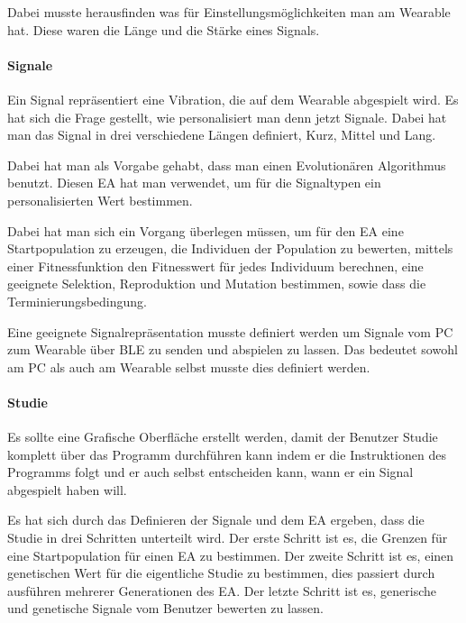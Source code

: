 Dabei musste herausfinden was f{\"u}r Einstellungsm{\"o}glichkeiten man am Wearable hat. Diese waren die L{\"a}nge und die St{\"a}rke eines Signals.

\paragraph{Signale}

Ein Signal repr{\"a}sentiert eine Vibration, die auf dem Wearable abgespielt wird. Es hat sich die Frage gestellt, wie personalisiert man denn jetzt Signale. Dabei hat man das Signal in drei verschiedene L{\"a}ngen definiert, Kurz, Mittel und Lang. 

Dabei hat man als Vorgabe gehabt, dass man einen Evolution{\"a}ren Algorithmus benutzt.
Diesen EA hat man verwendet, um f{\"u}r die Signaltypen ein personalisierten Wert bestimmen.

Dabei hat man sich ein Vorgang {\"u}berlegen m{\"u}ssen, um f{\"u}r den EA eine Startpopulation zu erzeugen, die Individuen der Population zu bewerten, mittels einer Fitnessfunktion den Fitnesswert f{\"u}r jedes Individuum berechnen, eine geeignete Selektion, Reproduktion und Mutation bestimmen, sowie dass die Terminierungsbedingung. 

Eine geeignete Signalrepr{\"a}sentation musste definiert werden um Signale vom PC zum Wearable {\"u}ber BLE zu senden und abspielen zu lassen. Das bedeutet sowohl am PC als auch am Wearable selbst musste dies definiert werden.

\paragraph{Studie}

Es sollte eine Grafische Oberfl{\"a}che erstellt werden, damit der Benutzer Studie komplett {\"u}ber das Programm durchf{\"u}hren kann indem er die Instruktionen des Programms folgt und er auch selbst entscheiden kann, wann er ein Signal abgespielt haben will.

Es hat sich durch das Definieren der Signale und dem EA ergeben, dass die Studie in drei Schritten unterteilt wird. 
Der erste Schritt ist es, die Grenzen f{\"u}r eine Startpopulation f{\"u}r einen EA zu bestimmen. 
Der zweite Schritt ist es, einen genetischen Wert f{\"u}r die eigentliche Studie zu bestimmen, dies passiert durch ausf{\"u}hren mehrerer Generationen des EA. Der letzte Schritt ist es, generische und genetische Signale vom Benutzer bewerten zu lassen.

